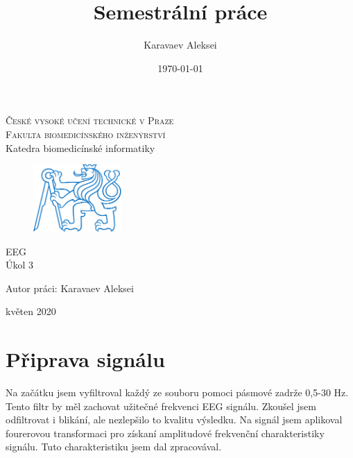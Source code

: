 \documentclass[a4paper,twoside,12pt]{article}
\begin{document}
	\pagestyle{empty}
	
	\title{Semestrální práce}
	\author{Karavaev Aleksei}
	\date{\today}
 
	\begin{titlepage}
 		\begin{center}
 		\textsc{\large{České vysoké učení technické v Praze}}\\
 		\textsc{\large{Fakulta biomedicínského inženýrství}}\\
		\large{Katedra biomedicínské informatiky}\\[2cm]
		
		\begin{figure}[!h]
			\centering
 			\includegraphics[width=0.3\textwidth]{symbol_cvut_konturova_verze}
 		\end{figure}
 		
		\Large{EEG}\\
		\Large{Úkol 3} 
		\vfill
		\end{center}		
		Autor práci: \hspace{0.55cm} Karavaev Aleksei\\
				
		\begin{center}
		květen 2020
		\end{center}
		\clearpage


	\end{titlepage}

	\pagestyle{fancy}	%
\section{Připrava signálu}
Na začátku jsem vyfiltroval každý ze souboru pomoci pásmové zadrže 0,5-30 Hz. Tento filtr by měl zachovat užitečné frekvenci EEG signálu.  Zkoušel jsem odfiltrovat i blikání, ale nezlepšilo to kvalitu výsledku. Na signál jsem aplikoval fourerovou transformaci pro získaní amplitudové frekvenční charakteristiky signálu. Tuto charakteristiku jsem dal zpracovával.
\end{document}
